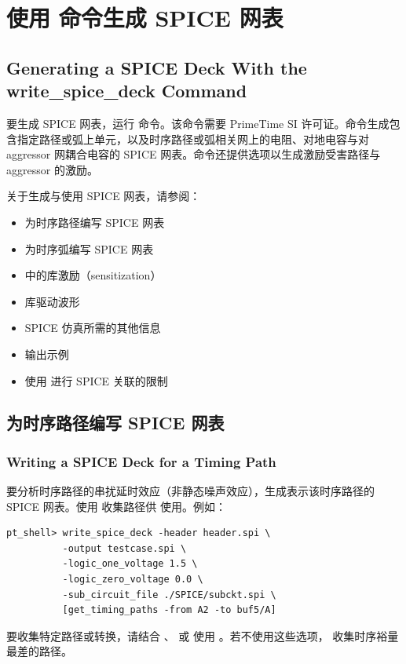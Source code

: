 \section{使用  命令生成 SPICE 网表}
\subsection*{Generating a SPICE Deck With the write\_spice\_deck Command}

要生成 SPICE 网表，运行  命令。该命令需要 PrimeTime SI 许可证。命令生成包含指定路径或弧上单元，以及时序路径或弧相关网上的电阻、对地电容与对 aggressor 网耦合电容的 SPICE 网表。命令还提供选项以生成激励受害路径与 aggressor 的激励。

关于生成与使用 SPICE 网表，请参阅：
\begin{itemize}
  \item 为时序路径编写 SPICE 网表
  \item 为时序弧编写 SPICE 网表
  \item {} 中的库激励（sensitization）
  \item 库驱动波形
  \item SPICE 仿真所需的其他信息
  \item {} 输出示例
  \item 使用  进行 SPICE 关联的限制
\end{itemize}

\subsection{为时序路径编写 SPICE 网表}
\subsubsection*{Writing a SPICE Deck for a Timing Path}

要分析时序路径的串扰延时效应（非静态噪声效应），生成表示该时序路径的 SPICE 网表。使用  收集路径供  使用。例如：
\begin{lstlisting}
pt_shell> write_spice_deck -header header.spi \
          -output testcase.spi \
          -logic_one_voltage 1.5 \
          -logic_zero_voltage 0.0 \
          -sub_circuit_file ./SPICE/subckt.spi \
          [get_timing_paths -from A2 -to buf5/A]
\end{lstlisting}

要收集特定路径或转换，请结合 \opt{-from}、\opt{-to} 或  使用 。若不使用这些选项， 收集时序裕量最差的路径。

